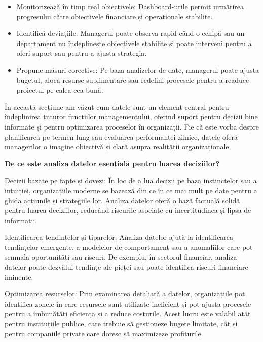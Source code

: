 \documentclass[
  11pt,
  b5paper,
  nottoc]{book}
\providecommand{\tightlist}{%
  \setlength{\itemsep}{0pt}\setlength{\parskip}{0pt}}\usepackage{longtable,booktabs,array}
\begin{document}
\begin{itemize}
\tightlist
\item
  Monitorizează în timp real obiectivele: Dashboard-urile permit
  urmărirea progresului către obiectivele financiare și operaționale
  stabilite.\\
\item
  Identifică deviațiile: Managerul poate observa rapid când o echipă sau
  un departament nu îndeplinește obiectivele stabilite și poate
  interveni pentru a oferi suport sau pentru a ajusta strategia.\\
\item
  Propune măsuri corective: Pe baza analizelor de date, managerul poate
  ajusta bugetul, aloca resurse suplimentare sau redefini procesele
  pentru a readuce proiectul pe calea cea bună.
\end{itemize}

În această secțiune am văzut cum datele sunt un element central pentru
îndeplinirea tuturor funcțiilor managementului, oferind suport pentru
decizii bine informate și pentru optimizarea proceselor în organizații.
Fie că este vorba despre planificarea pe termen lung sau evaluarea
performanței zilnice, datele oferă managerilor o imagine obiectivă și
clară asupra realității organizaționale.

\textbf{De ce este analiza datelor esențială pentru luarea deciziilor?}

Decizii bazate pe fapte și dovezi: În loc de a lua decizii pe baza
instinctelor sau a intuiției, organizațiile moderne se bazează din ce în
ce mai mult pe date pentru a ghida acțiunile și strategiile lor. Analiza
datelor oferă o bază factuală solidă pentru luarea deciziilor, reducând
riscurile asociate cu incertitudinea și lipsa de informații.

Identificarea tendințelor și tiparelor: Analiza datelor ajută la
identificarea tendințelor emergente, a modelelor de comportament sau a
anomaliilor care pot semnala oportunități sau riscuri. De exemplu, în
sectorul financiar, analiza datelor poate dezvălui tendințe ale pieței
sau poate identifica riscuri financiare iminente.

Optimizarea resurselor: Prin examinarea detaliată a datelor,
organizațiile pot identifica zonele în care resursele sunt utilizate
ineficient și pot ajusta procesele pentru a îmbunătăți eficiența și a
reduce costurile. Acest lucru este valabil atât pentru instituțiile
publice, care trebuie să gestioneze bugete limitate, cât și pentru
companiile private care doresc să maximizeze profiturile.
\end{document}
